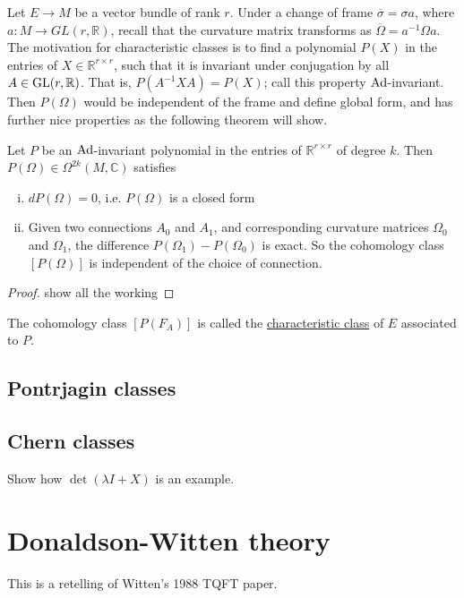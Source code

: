 Let $E\to M$ be a vector bundle of rank $r$. Under a change of frame
$\overline{\sigma}= \sigma a$, where $a : M \to GL(r,\mathbb{R})$, recall that
the curvature matrix transforms as $\overline{\Omega}=a^{-1}\Omega a$.  
The motivation for characteristic classes is to find a polynomial $P(X)$ in the
entries of $X\in \mathbb{R}^{r\times r}$, such that it is invariant under
conjugation by all $A\in \operatorname{GL}(r,\mathbb{R})$. That is, $P(A^{-1}XA)=P(X)$; call
this property $\operatorname{Ad}$-invariant. Then $P(\Omega)$ would be
independent of the frame and define global form, and has further nice
properties as the following theorem will show.

\begin{thm} Let $P$ be an $\operatorname{Ad}$-invariant 
	polynomial in the entries of $\mathbb{R}^{r\times r}$ of degree $k$. 
	Then $P(\Omega) \in \Omega^{2k}(M,\mathbb{C})$ satisfies
	\begin{enumerate}[(i)]
	    \item $dP(\Omega)= 0$, i.e. $P(\Omega)$ is a closed form
		\item Given two connections $A_0$ and $A_1$, and corresponding
			 curvature matrices $\Omega_0$ and $\Omega_1$, the difference
			 $P(\Omega_1)-P(\Omega_0)$ is exact. So the cohomology class
			 $[P(\Omega)]$ is independent of the choice of connection.
	\end{enumerate}
\end{thm}
\begin{proof}
	show all the working
\end{proof}

The cohomology class $[P(F_A)]$ is called the \underline{characteristic
class} of  $E$ associated to  $P$. 

\subsection{Pontrjagin classes}


\subsection{Chern classes}
Show how $\det(\lambda I + X)$ is an example.

\section{Donaldson-Witten theory}
This is a retelling of Witten's 1988 TQFT paper. 

